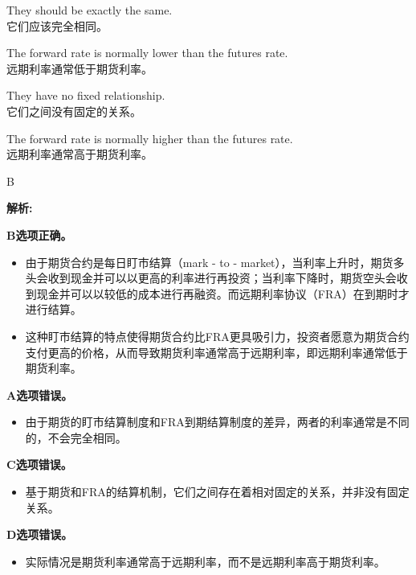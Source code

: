 \documentclass{article}
\newenvironment{explanation}
{\textbf{解析:}\par}
{\par}
\begin{document}
    \begin{choices}
        \item They should be exactly the same.\\
        它们应该完全相同。
        \item The forward rate is normally lower than the futures rate.\\
        远期利率通常低于期货利率。
        \item They have no fixed relationship.\\
        它们之间没有固定的关系。
        \item The forward rate is normally higher than the futures rate.\\
        远期利率通常高于期货利率。
    \end{choices}
    
    \begin{correctanswer}
        B
    \end{correctanswer}
    
    \begin{explanation}
    \textbf{B选项正确。}
    \begin{itemize}
        \item 由于期货合约是每日盯市结算（mark - to - market），当利率上升时，期货多头会收到现金并可以以更高的利率进行再投资；当利率下降时，期货空头会收到现金并可以以较低的成本进行再融资。而远期利率协议（FRA）在到期时才进行结算。
        \item 这种盯市结算的特点使得期货合约比FRA更具吸引力，投资者愿意为期货合约支付更高的价格，从而导致期货利率通常高于远期利率，即远期利率通常低于期货利率。
    \end{itemize}
    \textbf{A选项错误。}
    \begin{itemize}
        \item 由于期货的盯市结算制度和FRA到期结算制度的差异，两者的利率通常是不同的，不会完全相同。
    \end{itemize}
    \textbf{C选项错误。}
    \begin{itemize}
        \item 基于期货和FRA的结算机制，它们之间存在着相对固定的关系，并非没有固定关系。
    \end{itemize}
    \textbf{D选项错误。}
    \begin{itemize}
        \item 实际情况是期货利率通常高于远期利率，而不是远期利率高于期货利率。
    \end{itemize}
    \end{explanation}
    
\end{document}
